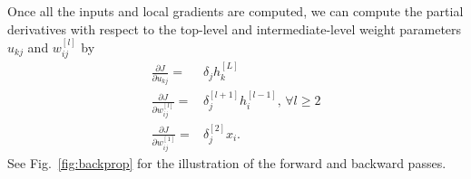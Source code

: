 \documentclass[dissertation,nocontribution]{aaltoseries}
\newcommand{\qlay}[1]{\left[#1\right]}
\begin{document}
Once all the inputs and local gradients are computed, we can
compute the
partial derivatives with respect to the
top-level and intermediate-level weight parameters $u_{kj}$
and $w_{ij}^{\qlay{l}}$ 
by
\begin{align*}
    \frac{\partial J}{\partial u_{kj}} =& \delta_j
    h_k^{\qlay{L}}
    \nonumber \\
    \frac{\partial J}{\partial w_{ij}^{\qlay{l}}} =&
    \delta_j^{\qlay{l+1}} h_i^{\qlay{l-1}} \text{, }\forall l \geq 2 
    \nonumber \\
    \frac{\partial J}{\partial w_{ij}^{\qlay{1}}} =&
    \delta_j^{\qlay{2}} x_i.
\end{align*}
See Fig.~\ref{fig:backprop}
for the illustration of the forward and backward passes.
\end{document}

